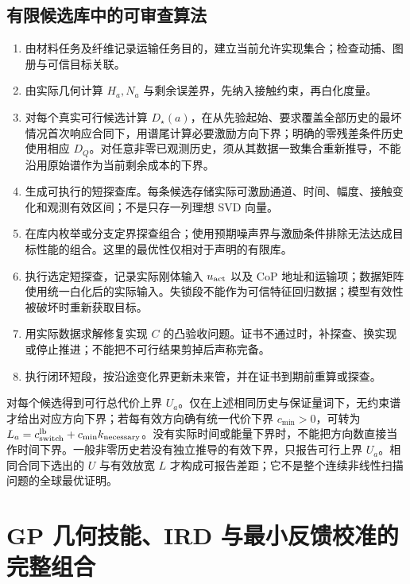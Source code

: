 \documentclass[11pt,a4paper]{article}
\numberwithin{equation}{section}
\theoremstyle{definition}
\begin{document}
\subsection{有限候选库中的可审查算法}
\begin{enumerate}
\item 由材料任务及纤维记录运输任务目的，建立当前允许实现集合；检查动捕、图册与可信目标关联。
\item 由实际几何计算 $H_a,N_a$ 与剩余误差界，先纳入接触约束，再白化度量。
\item 对每个真实可行候选计算 $D_\star(a)$，在从先验起始、要求覆盖全部历史的最坏情况首次响应合同下，用谱尾计算必要激励方向下界；明确的零残差条件历史使用相应 $D_Q$。对任意非零已观测历史，须从其数据一致集合重新推导，不能沿用原始谱作为当前剩余成本的下界。
\item 生成可执行的短探查库。每条候选存储实际可激励通道、时间、幅度、接触变化和观测有效区间；不是只存一列理想 SVD 向量。
\item 在库内枚举或分支定界探查组合；使用预期噪声界与激励条件排除无法达成目标性能的组合。这里的最优性仅相对于声明的有限库。
\item 执行选定短探查，记录实际刚体输入 $u_{\rm act}$ 以及 CoP 地址和运输项；数据矩阵使用统一白化后的实际输入。失锁段不能作为可信特征回归数据；模型有效性被破坏时重新获取目标。
\item 用实际数据求解修复实现 $C$ 的凸验收问题。证书不通过时，补探查、换实现或停止推进；不能把不可行结果剪掉后声称完备。
\item 执行闭环短段，按沿途变化界更新未来管，并在证书到期前重算或探查。
\end{enumerate}
对每个候选得到可行总代价上界 $U_a$。仅在上述相同历史与保证量词下，无约束谱才给出对应方向下界；若每有效方向确有统一代价下界 $c_{\min}>0$，可转为 $L_a=c_{\rm switch}^{\rm lb}+c_{\min}k_{\rm necessary}$。没有实际时间或能量下界时，不能把方向数直接当作时间下界。一般非零历史若没有独立推导的有效下界，只报告可行上界 $U_a$。相同合同下选出的 $U$ 与有效放宽 $L$ 才构成可报告差距；它不是整个连续非线性扫描问题的全球最优证明。





\section{GP 几何技能、IRD 与最小反馈校准的完整组合}
\label{sec:v43:integration}
\end{document}
